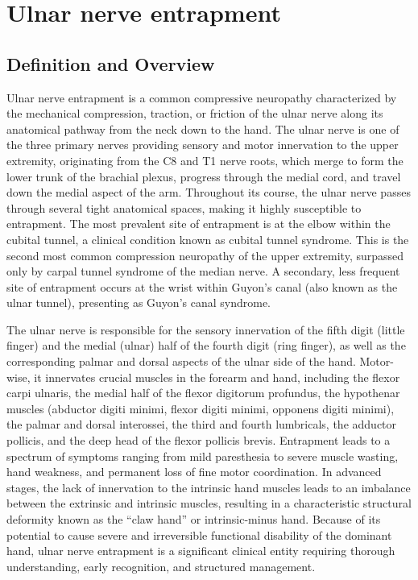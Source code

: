 \chapter{Ulnar nerve entrapment}

\section*{Definition and Overview}
Ulnar nerve entrapment is a common compressive neuropathy characterized by the mechanical compression, traction, or friction of the ulnar nerve along its anatomical pathway from the neck down to the hand. The ulnar nerve is one of the three primary nerves providing sensory and motor innervation to the upper extremity, originating from the C8 and T1 nerve roots, which merge to form the lower trunk of the brachial plexus, progress through the medial cord, and travel down the medial aspect of the arm. Throughout its course, the ulnar nerve passes through several tight anatomical spaces, making it highly susceptible to entrapment. The most prevalent site of entrapment is at the elbow within the cubital tunnel, a clinical condition known as cubital tunnel syndrome. This is the second most common compression neuropathy of the upper extremity, surpassed only by carpal tunnel syndrome of the median nerve. A secondary, less frequent site of entrapment occurs at the wrist within Guyon's canal (also known as the ulnar tunnel), presenting as Guyon's canal syndrome.

The ulnar nerve is responsible for the sensory innervation of the fifth digit (little finger) and the medial (ulnar) half of the fourth digit (ring finger), as well as the corresponding palmar and dorsal aspects of the ulnar side of the hand. Motor-wise, it innervates crucial muscles in the forearm and hand, including the flexor carpi ulnaris, the medial half of the flexor digitorum profundus, the hypothenar muscles (abductor digiti minimi, flexor digiti minimi, opponens digiti minimi), the palmar and dorsal interossei, the third and fourth lumbricals, the adductor pollicis, and the deep head of the flexor pollicis brevis. Entrapment leads to a spectrum of symptoms ranging from mild paresthesia to severe muscle wasting, hand weakness, and permanent loss of fine motor coordination. In advanced stages, the lack of innervation to the intrinsic hand muscles leads to an imbalance between the extrinsic and intrinsic muscles, resulting in a characteristic structural deformity known as the ``claw hand'' or intrinsic-minus hand. Because of its potential to cause severe and irreversible functional disability of the dominant hand, ulnar nerve entrapment is a significant clinical entity requiring thorough understanding, early recognition, and structured management.

